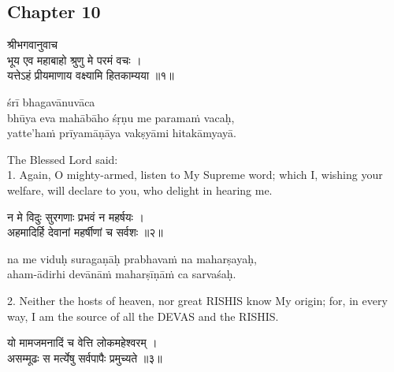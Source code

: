 \chapterdrop

\begin{center}

\headerspace
{}

\section{Chapter 10}

\headerspace
{}

\headerspace
{}

\headerspace
{}

\headerspace
\end{center}

\begin{gitaverse}
श्रीभगवानुवाच \\
भूय एव महाबाहो श्रुणु मे परमं वचः । \\
यत्तेऽहं प्रीयमाणाय वक्ष्यामि हितकाम्यया ॥१॥
\end{gitaverse}

\begin{transliteration}
śrī bhagavānuvāca \\
bhūya eva mahābāho śṛṇu me paramaṁ vacaḥ, \\
yatte'haṁ prīyamāṇāya vakṣyāmi hitakāmyayā.
\end{transliteration}

The Blessed Lord said: \\
1. Again, O mighty-armed, listen to My Supreme word; which I, wishing your
welfare, will declare to you, who delight in hearing me.

\begin{gitaverse}
न मे विदुः सुरगणाः प्रभवं न महर्षयः । \\
अहमादिर्हि देवानां महर्षीणां च सर्वशः ॥२॥
\end{gitaverse}

\begin{transliteration}
na me viduḥ suragaṇāḥ prabhavaṁ na maharṣayaḥ, \\
aham-ādirhi devānāṁ maharṣīṇāṁ ca sarvaśaḥ.
\end{transliteration}

2. Neither the hosts of heaven, nor great RISHIS know My origin; for, in every
way, I am the source of all the DEVAS and the RISHIS.\@

\begin{gitaverse}
यो मामजमनादिं च वेत्ति लोकमहेश्वरम् । \\
असम्मूढः स मर्त्येषु सर्वपापैः प्रमुच्यते ॥३॥
\end{gitaverse}

